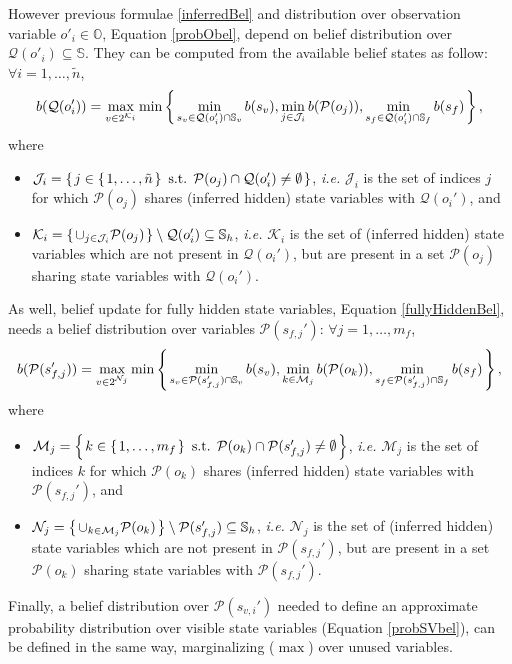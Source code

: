 However previous formulae \ref{inferredBel} 
and distribution over observation variable $o'_i \in \mathbb{O}$, Equation \ref{probObel}, 
depend on belief distribution
over $\mathcal{Q}(o'_i) \subseteq \mathbb{S}$.
They can be computed from the available belief states as follow: $\forall i=1,\ldots,\tilde{n}$,
\begin{eqnarray}
\label{bq}
b(\mathcal{Q}(o_i')) = \max_{v \in 2^{\mathcal{K}_i}}  \min \left\{ \left.  \min_{s_{v} \in \mathcal{Q}(o_i') \cap \mathbb{S}_v} b(s_{v}), \min_{j \in \mathcal{J}_i }  b(\mathcal{P}(o_j)), \min_{s_{f} \in \mathcal{Q}(o_i') \cap \mathbb{S}_f} b(s_{f})  \right. \right\},
\end{eqnarray}
where
\begin{itemize}
\item $\mathcal{J}_i = \left\{ \left.  j \in \left\{ \left. 1,\ldots,\tilde{n} \right. \right\} \mbox{ s.t. } \mathcal{P}(o_j) \cap \mathcal{Q}(o_i') \neq \emptyset \right. \right\}$, \textit{i.e.} $\mathcal{J}_i$ is the set of indices $j$ 
for which $\mathcal{P}(o_j)$ shares (inferred hidden) state variables with $\mathcal{Q}(o_i')$,
and
\item $\mathcal{K}_i = \left\{ \left. \cup_{j \in \mathcal{J}_i} \mathcal{P}(o_j) \right. \right\} \setminus \mathcal{Q}(o_i') \subseteq \mathbb{S}_h$, \textit{i.e.} $\mathcal{K}_i$ 
is the set of (inferred hidden) state variables which are not present in 
$\mathcal{Q}(o_i')$, but are present in a set $\mathcal{P}(o_j)$ 
sharing state variables with $\mathcal{Q}(o_i')$. 
\end{itemize}
As well, belief update for fully hidden state variables, Equation \ref{fullyHiddenBel}, 
needs a belief distribution over variables $\mathcal{P}(s_{f,j}')$:
$\forall j=1,\ldots,m_f$, 
\begin{eqnarray} 
\label{bp}
b(\mathcal{P}(s_{f,j}')) =  \max_{v \in 2^{\mathcal{N}_j}}  \min \left\{ \left.  \min_{s_{v} \in \mathcal{P}(s_{f,j}') \cap \mathbb{S}_v} b(s_{v}),
\nonumber\min_{k \in \mathcal{M}_j }  b(\mathcal{P}(o_k)), \min_{s_{f} \in \mathcal{P}(s_{f,j}') \cap \mathbb{S}_f} b(s_{f})  \right. \right\},
\end{eqnarray}
where
\begin{itemize}
\item $\mathcal{M}_j= \left\{ \left.  k \in \left\{ \left. 1,\ldots,m_f \right. \right\} \mbox{ s.t. } 
\mathcal{P}(o_k) \cap \mathcal{P}(s_{f,j}') \neq \emptyset \right. \right\}$, \textit{i.e.} $\mathcal{M}_j$ 
is the set of indices $k$ for which $\mathcal{P}(o_k)$ shares (inferred hidden) state variables with $\mathcal{P}(s_{f,j}')$, and
\item $\mathcal{N}_j = \left\{ \left. \cup_{k \in \mathcal{M}_j} \mathcal{P}(o_k) \right. \right\} 
\setminus \mathcal{P}(s_{f,j}') \subseteq \mathbb{S}_h$, \textit{i.e.} $\mathcal{N}_j$ 
is the set of (inferred hidden) state variables which are not present in 
$\mathcal{P}(s_{f,j}')$, but are present in a set $\mathcal{P}(o_k)$ 
sharing state variables with $\mathcal{P}(s_{f,j}')$. 
\end{itemize}
Finally, a belief distribution over $\mathcal{P}(s_{v,i}')$ needed to define an
approximate probability distribution over visible state variables (Equation \ref{probSVbel}),
can be defined in the same way, marginalizing ($\max$) over unused variables.

